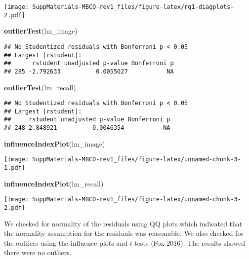 \documentclass[11pt,]{article}
\newenvironment{Shaded}{\begin{snugshade}}{\end{snugshade}}
\newcommand{\KeywordTok}[1]{\textcolor[rgb]{0.13,0.29,0.53}{\textbf{#1}}}
\newcommand{\NormalTok}[1]{#1}
\begin{document}
\texttt{[image: SuppMaterials-MBCO-rev1\_files/figure-latex/rq1-diagplots-2.pdf]}

\begin{Shaded}
\begin{Highlighting}[]
\KeywordTok{outlierTest}\NormalTok{(lm_image)}
\end{Highlighting}
\end{Shaded}

\begin{verbatim}
## No Studentized residuals with Bonferroni p < 0.05
## Largest |rstudent|:
##      rstudent unadjusted p-value Bonferroni p
## 285 -2.792633          0.0055027           NA
\end{verbatim}

\begin{Shaded}
\begin{Highlighting}[]
\KeywordTok{outlierTest}\NormalTok{(lm_recall)}
\end{Highlighting}
\end{Shaded}

\begin{verbatim}
## No Studentized residuals with Bonferroni p < 0.05
## Largest |rstudent|:
##     rstudent unadjusted p-value Bonferroni p
## 248 2.848921          0.0046354           NA
\end{verbatim}

\begin{Shaded}
\begin{Highlighting}[]
\KeywordTok{influenceIndexPlot}\NormalTok{(lm_image)}
\end{Highlighting}
\end{Shaded}

\texttt{[image: SuppMaterials-MBCO-rev1\_files/figure-latex/unnamed-chunk-3-1.pdf]}

\begin{Shaded}
\begin{Highlighting}[]
\KeywordTok{influenceIndexPlot}\NormalTok{(lm_recall)}
\end{Highlighting}
\end{Shaded}

\texttt{[image: SuppMaterials-MBCO-rev1\_files/figure-latex/unnamed-chunk-3-2.pdf]}

We checked for normality of the residuals using QQ plots which indicated
that the normality assumption for the residuals was reasonable. We also
checked for the outliers using the influence plots and \(t\)-tests (Fox
2016). The results showed there were no outliers.
\end{document}
